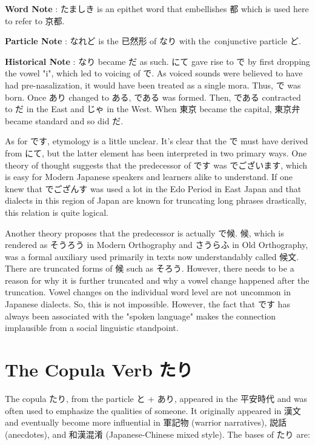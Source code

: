 \par{\textbf{Word Note }: たましき is an epithet word that embellishes 都 which is used here to refer to 京都. }

\par{\textbf{Particle Note }: なれど is the 已然形 of なり with the conjunctive particle ど. }
 
\par{\textbf{Historical Note }: なり became だ as such. にて gave rise to で by first dropping the vowel "i", which led to voicing of で. As voiced sounds were believed to have had pre-nasalization, it would have been treated as a single mora. Thus, で was born. Once あり changed to ある, である was formed. Then, である contracted to だ in the East and じゃ in the West. When 東京 became the capital, 東京弁 became standard and so did だ. }

\par{ As for です, etymology is a little unclear. It's clear that the で must have derived from にて, but the latter element has been interpreted in two primary ways. One theory of thought suggests that the predecessor of です was でございます, which is easy for Modern Japanese speakers and learners alike to understand. If one knew that でござんす was used a lot in the Edo Period in East Japan and that dialects in this region of Japan are known for truncating long phrases drastically, this relation is quite logical. }

\par{ Another theory proposes that the predecessor is actually で候. 候, which is rendered as そうろう in Modern Orthography and さうらふ in Old Orthography, was a formal auxiliary used primarily in texts now understandably called 候文. There are truncated forms of 候 such as そろう. However, there needs to be a reason for why it is further truncated and why a vowel change happened after the truncation. Vowel changes on the individual word level are not uncommon in Japanese dialects. So, this is not impossible. However, the fact that です has always been associated with the "spoken language" makes the connection implausible from a social linguistic standpoint. }
      
\section{The Copula Verb たり}
 
\par{ The copula たり, from the particle と + あり, appeared in the 平安時代 and was often used to emphasize the qualities of someone. It originally appeared in 漢文 and eventually become more influential in 軍記物 (warrior narratives), 説話 (anecdotes), and 和漢混淆 (Japanese-Chinese mixed style). The bases of たり are: }

